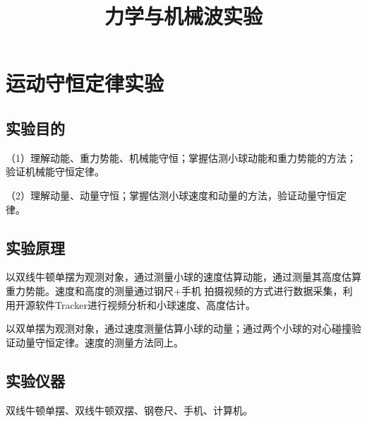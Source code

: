 \documentclass[UTF8]{article}
\title{\textbf{力学与机械波实验}}
\author{}
\date{}
\begin{document}
    \thispagestyle{empty}
    \maketitle
    \newpage
    \thispagestyle{empty}
    \tableofcontents
    \newpage


    \section{运动守恒定律实验}
        \subsection{实验目的}
            \noindent\hspace{2em}（1）理解动能、重力势能、机械能守恒；掌握估测小球动能和重力势能的方法；验证机械能守恒定律。
            
            \noindent\hspace{2em}（2）理解动量、动量守恒；掌握估测小球速度和动量的方法，验证动量守恒定律。
        \subsection{实验原理}
            \noindent\hspace{2em}以双线牛顿单摆为观测对象，通过测量小球的速度估算动能，通过测量其高度估算重力势能。速度和高度的测量通过钢尺+手机
            拍摄视频的方式进行数据采集，利用开源软件Tracker进行视频分析和小球速度、高度估计。

            \noindent\hspace{2em}以双单摆为观测对象，通过速度测量估算小球的动量；通过两个小球的对心碰撞验证动量守恒定律。速度的测量方法同上。
        \subsection{实验仪器}
            \noindent\hspace{2em}双线牛顿单摆、双线牛顿双摆、钢卷尺、手机、计算机。
\end{document}
